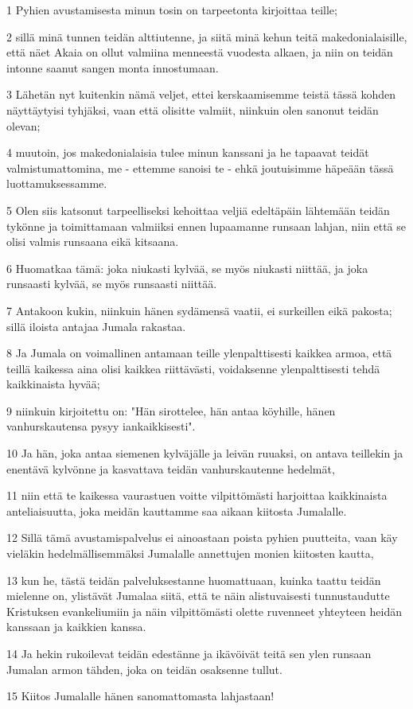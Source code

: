 \par 1 Pyhien avustamisesta minun tosin on tarpeetonta kirjoittaa teille;
\par 2 sillä minä tunnen teidän alttiutenne, ja siitä minä kehun teitä makedonialaisille, että näet Akaia on ollut valmiina menneestä vuodesta alkaen, ja niin on teidän intonne saanut sangen monta innostumaan.
\par 3 Lähetän nyt kuitenkin nämä veljet, ettei kerskaamisemme teistä tässä kohden näyttäytyisi tyhjäksi, vaan että olisitte valmiit, niinkuin olen sanonut teidän olevan;
\par 4 muutoin, jos makedonialaisia tulee minun kanssani ja he tapaavat teidät valmistumattomina, me - ettemme sanoisi te - ehkä joutuisimme häpeään tässä luottamuksessamme.
\par 5 Olen siis katsonut tarpeelliseksi kehoittaa veljiä edeltäpäin lähtemään teidän tykönne ja toimittamaan valmiiksi ennen lupaamanne runsaan lahjan, niin että se olisi valmis runsaana eikä kitsaana.
\par 6 Huomatkaa tämä: joka niukasti kylvää, se myös niukasti niittää, ja joka runsaasti kylvää, se myös runsaasti niittää.
\par 7 Antakoon kukin, niinkuin hänen sydämensä vaatii, ei surkeillen eikä pakosta; sillä iloista antajaa Jumala rakastaa.
\par 8 Ja Jumala on voimallinen antamaan teille ylenpalttisesti kaikkea armoa, että teillä kaikessa aina olisi kaikkea riittävästi, voidaksenne ylenpalttisesti tehdä kaikkinaista hyvää;
\par 9 niinkuin kirjoitettu on: "Hän sirottelee, hän antaa köyhille, hänen vanhurskautensa pysyy iankaikkisesti".
\par 10 Ja hän, joka antaa siemenen kylväjälle ja leivän ruuaksi, on antava teillekin ja enentävä kylvönne ja kasvattava teidän vanhurskautenne hedelmät,
\par 11 niin että te kaikessa vaurastuen voitte vilpittömästi harjoittaa kaikkinaista anteliaisuutta, joka meidän kauttamme saa aikaan kiitosta Jumalalle.
\par 12 Sillä tämä avustamispalvelus ei ainoastaan poista pyhien puutteita, vaan käy vieläkin hedelmällisemmäksi Jumalalle annettujen monien kiitosten kautta,
\par 13 kun he, tästä teidän palveluksestanne huomattuaan, kuinka taattu teidän mielenne on, ylistävät Jumalaa siitä, että te näin alistuvaisesti tunnustaudutte Kristuksen evankeliumiin ja näin vilpittömästi olette ruvenneet yhteyteen heidän kanssaan ja kaikkien kanssa.
\par 14 Ja hekin rukoilevat teidän edestänne ja ikävöivät teitä sen ylen runsaan Jumalan armon tähden, joka on teidän osaksenne tullut.
\par 15 Kiitos Jumalalle hänen sanomattomasta lahjastaan!

